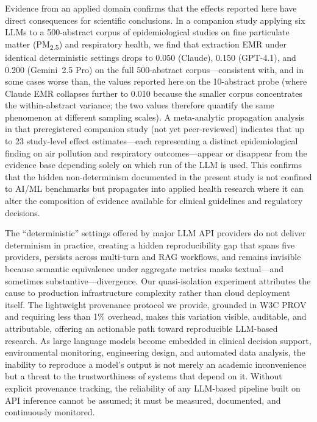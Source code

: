 \documentclass[sn-nature]{sn-jnl}
\begin{document}
Evidence from an applied domain confirms that the effects reported here have direct consequences for scientific conclusions.
In a companion study applying six LLMs to a 500-abstract corpus of epidemiological studies on fine particulate matter (PM\textsubscript{2.5}) and respiratory health\cite{rover2026evidence}, we find that extraction EMR under identical deterministic settings drops to 0.050 (Claude), 0.150 (GPT-4.1), and 0.200 (Gemini~2.5 Pro) on the full 500-abstract corpus---consistent with, and in some cases worse than, the values reported here on the 10-abstract probe (where Claude EMR collapses further to 0.010 because the smaller corpus concentrates the within-abstract variance; the two values therefore quantify the same phenomenon at different sampling scales).
A meta-analytic propagation analysis in that preregistered companion study (not yet peer-reviewed) indicates that up to 23 study-level effect estimates---each representing a distinct epidemiological finding on air pollution and respiratory outcomes---appear or disappear from the evidence base depending solely on which run of the LLM is used.
This confirms that the hidden non-determinism documented in the present study is not confined to AI/ML benchmarks but propagates into applied health research where it can alter the composition of evidence available for clinical guidelines and regulatory decisions.

The ``deterministic'' settings offered by major LLM API providers do not deliver determinism in practice, creating a hidden reproducibility gap that spans five providers, persists across multi-turn and RAG workflows, and remains invisible because semantic equivalence under aggregate metrics masks textual---and sometimes substantive---divergence.
Our quasi-isolation experiment attributes the cause to production infrastructure complexity rather than cloud deployment itself.
The lightweight provenance protocol we provide, grounded in W3C PROV and requiring less than 1\% overhead, makes this variation visible, auditable, and attributable, offering an actionable path toward reproducible LLM-based research.
As large language models become embedded in clinical decision support, environmental monitoring, engineering design, and automated data analysis, the inability to reproduce a model's output is not merely an academic inconvenience but a threat to the trustworthiness of systems that depend on it.
Without explicit provenance tracking, the reliability of any LLM-based pipeline built on API inference cannot be assumed; it must be measured, documented, and continuously monitored.
\end{document}
